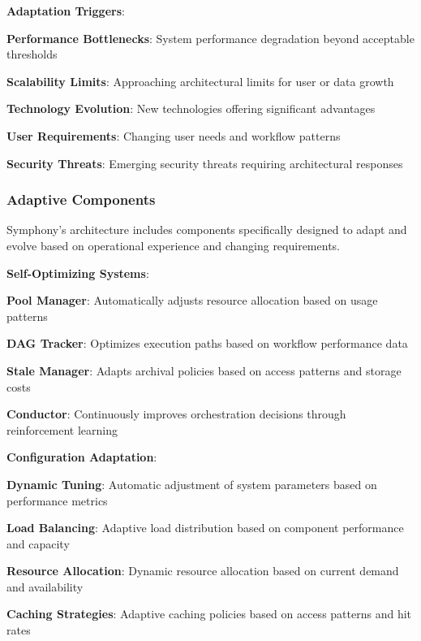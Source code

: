 \textbf{Adaptation Triggers}:
\begin{compactlist}
    \item \textbf{Performance Bottlenecks}: System performance degradation beyond acceptable thresholds
    \item \textbf{Scalability Limits}: Approaching architectural limits for user or data growth
    \item \textbf{Technology Evolution}: New technologies offering significant advantages
    \item \textbf{User Requirements}: Changing user needs and workflow patterns
    \item \textbf{Security Threats}: Emerging security threats requiring architectural responses
\end{compactlist}

\subsubsection*{Adaptive Components}

Symphony's architecture includes components specifically designed to adapt and evolve based on operational experience and changing requirements.

\textbf{Self-Optimizing Systems}:
\begin{compactlist}
    \item \textbf{Pool Manager}: Automatically adjusts resource allocation based on usage patterns
    \item \textbf{DAG Tracker}: Optimizes execution paths based on workflow performance data
    \item \textbf{Stale Manager}: Adapts archival policies based on access patterns and storage costs
    \item \textbf{Conductor}: Continuously improves orchestration decisions through reinforcement learning
\end{compactlist}

\textbf{Configuration Adaptation}:
\begin{compactlist}
    \item \textbf{Dynamic Tuning}: Automatic adjustment of system parameters based on performance metrics
    \item \textbf{Load Balancing}: Adaptive load distribution based on component performance and capacity
    \item \textbf{Resource Allocation}: Dynamic resource allocation based on current demand and availability
    \item \textbf{Caching Strategies}: Adaptive caching policies based on access patterns and hit rates
\end{compactlist}

